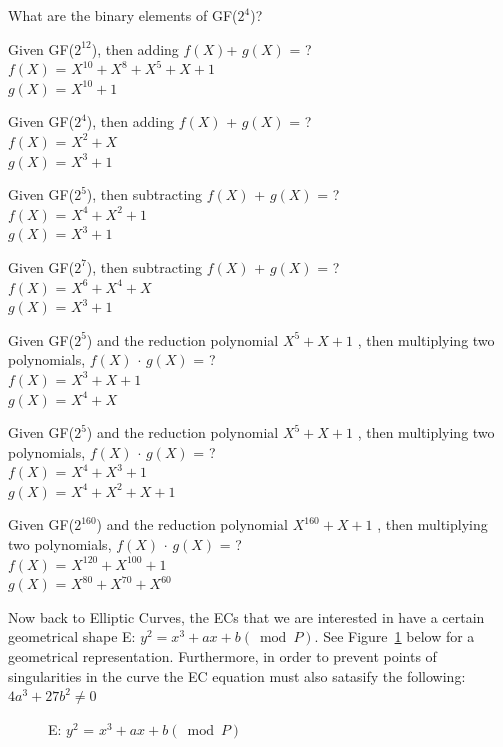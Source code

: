\begin{exer}
What are the binary elements of GF($2^4$)?
\end{exer}
\begin{exer}
Given GF($2^{12}$), then adding $f(X)$+ $g(X)$ = ?
        \\ $f(X)$ = $X^{10} + X^8 + X^5 + X + 1$
        \\ $g(X)$ = $X^{10} + 1$
\end{exer}
\begin{exer}
Given GF($2^4$), then adding $f(X)$ + $g(X)$ = ?
        \\ $f(X)$ = $X^{2} + X $
        \\ $g(X)$ = $X^{3} + 1$
\end{exer}
\begin{exer}
Given GF($2^5$), then subtracting $f(X)$ + $g(X)$ = ?
        \\ $f(X)$ = $X^{4} + X^2 + 1 $
        \\ $g(X)$ = $X^{3} + 1$
\end{exer}
\begin{exer}
Given GF($2^7$), then subtracting $f(X)$ + $g(X)$ = ?
        \\ $f(X)$ = $X^{6} + X^4 + X $
        \\ $g(X)$ = $X^{3} + 1$
\end{exer}
\begin{exer}
Given GF($2^5$) and the reduction polynomial $X^5 + X + 1$ , then multiplying two polynomials, $f(X)$ $\cdot$ $g(X)$ = ?
        \\ $f(X)$ = $X^{3} + X + 1 $
        \\ $g(X)$ = $X^{4} + X$
\end{exer}
\begin{exer}
Given GF($2^5$) and the reduction polynomial $X^5 + X + 1$ , then multiplying two polynomials, $f(X)$ $\cdot$ $g(X)$ = ?
        \\ $f(X)$ = $X^{4} + X^3 + 1 $
        \\ $g(X)$ = $X^{4} + X^2 + X + 1$
\end{exer}
\begin{exer}
Given GF($2^{160}$) and the reduction polynomial $X^{160} + X + 1$ , then multiplying two polynomials, $f(X)$ $\cdot$ $g(X)$ = ?
        \\ $f(X)$ = $X^{120} + X^{100} + 1 $
        \\ $g(X)$ = $X^{80} + X^{70} + X^{60}$
\end{exer}
Now back to Elliptic Curves, the  ECs that we are interested in have a certain geometrical shape E: $y^2 = x^3 + ax + b (\bmod P)$.  See Figure~\ref{fig:DH:DHKE_5} below for a geometrical representation.  Furthermore, in order to prevent points of singularities in the curve the EC equation must also satasify the following: $4a^3 + 27b^2 \neq 0$
\begin{figure}[H]
	  \caption{\label{fig:DH:DHKE_5}   E: $ y^2$ = $x^3+ax+b (\bmod P)$ }
\end{figure}
